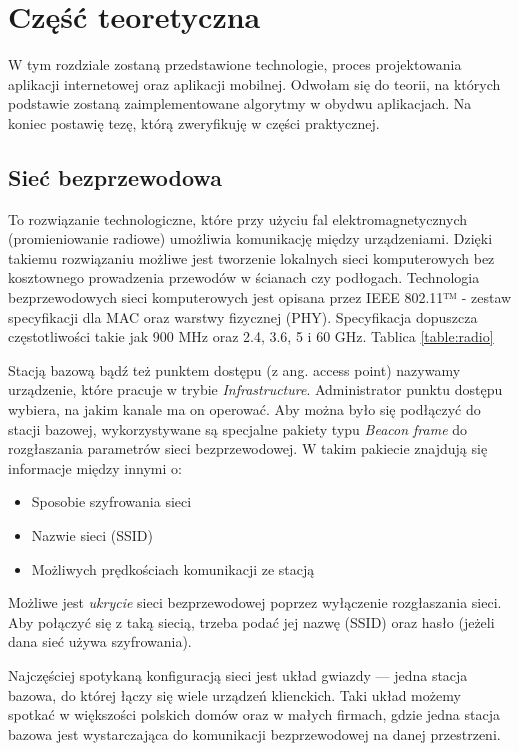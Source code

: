 \chapter{Część teoretyczna}

W tym rozdziale zostaną przedstawione technologie, proces projektowania aplikacji internetowej oraz aplikacji mobilnej. Odwołam się do teorii, na których podstawie zostaną zaimplementowane algorytmy w obydwu aplikacjach. Na koniec postawię tezę, którą zweryfikuję w części praktycznej.

\section{Sieć bezprzewodowa}
To rozwiązanie technologiczne, które przy użyciu fal elektromagnetycznych (promieniowanie radiowe) umożliwia komunikację między urządzeniami. Dzięki takiemu rozwiązaniu możliwe jest tworzenie lokalnych sieci komputerowych bez kosztownego prowadzenia przewodów w ścianach czy podłogach. Technologia bezprzewodowych sieci komputerowych jest opisana przez IEEE 802.11™ - zestaw specyfikacji dla MAC oraz warstwy fizycznej (PHY). Specyfikacja dopuszcza częstotliwości takie jak 900 MHz oraz 2.4, 3.6, 5 i 60 GHz. Tablica \ref{table:radio}

Stacją bazową bądź też punktem dostępu (z ang. access point) nazywamy urządzenie, które pracuje w trybie \textit{Infrastructure}. Administrator punktu dostępu wybiera, na jakim kanale ma on operować. Aby można było się podłączyć do stacji bazowej, wykorzystywane są specjalne pakiety typu \textit{Beacon frame} do rozgłaszania parametrów sieci bezprzewodowej. W takim pakiecie znajdują się informacje między innymi o:
\begin{itemize}
    \item Sposobie szyfrowania sieci
    \item Nazwie sieci (SSID)
    \item Możliwych prędkościach komunikacji ze stacją
\end{itemize}

Możliwe jest \textit{ukrycie} sieci bezprzewodowej poprzez wyłączenie rozgłaszania sieci. Aby połączyć się z taką siecią, trzeba podać jej nazwę (SSID) oraz hasło (jeżeli dana sieć używa szyfrowania).

Najczęściej spotykaną konfiguracją sieci jest układ gwiazdy — jedna stacja bazowa, do której łączy się wiele urządzeń klienckich. Taki układ możemy spotkać w większości polskich domów oraz w małych firmach, gdzie jedna stacja bazowa jest wystarczająca do komunikacji bezprzewodowej na danej przestrzeni.

